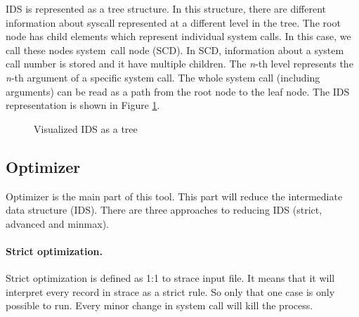 IDS is represented as a tree structure. In this structure, there are different
information about syscall represented at a different level in the tree. The root
node has child elements which represent individual system calls. In this case,
we call these nodes system~call node (SCD). In SCD, information about a system
call number is stored and it have multiple children. The \textit{n}-th level
represents the \textit{n}-th argument of a specific system call. The whole
system call (including arguments) can be read as a path from the root node to
the leaf node. The IDS representation is shown in Figure \ref{fig:tikz:IDStree}.

\begin{figure}[H]
\centering
  \caption{Visualized IDS as a tree}
  \label{fig:tikz:IDStree}
\end{figure}

\subsection{Optimizer}
Optimizer is the main part of this tool.
This part will reduce the intermediate data structure (IDS).
There are three approaches to reducing IDS (strict, advanced and minmax).

	\paragraph{Strict optimization.}
	Strict optimization is defined as 1:1 to strace input file.
	It means that it will interpret every record in strace as a strict rule.
	So only that one case is only possible to run.
	Every minor change in system call will kill the process.

